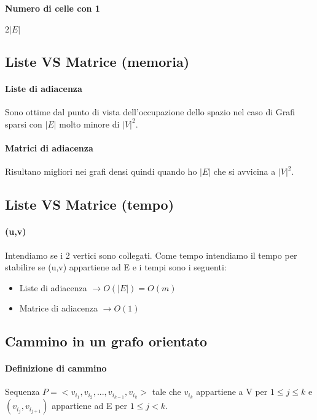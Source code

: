 \paragraph*{Numero di celle con 1} $2|E|$
\subsection{Liste VS Matrice (memoria)}
\paragraph*{Liste di adiacenza} Sono ottime dal punto di vista dell'occupazione dello spazio 
nel caso di Grafi sparsi con $|E|$ molto minore di $|V|^2$.
\paragraph*{Matrici di adiacenza} Risultano migliori nei grafi densi quindi quando ho
$|E|$ che si avvicina a $|V|^2$.
\subsection{Liste VS Matrice (tempo)}
\paragraph*{(u,v)} Intendiamo se i 2 vertici sono collegati.
Come tempo intendiamo il tempo per stabilire se (u,v) appartiene ad E e i tempi
sono i seguenti:
\begin{itemize}
    \item Liste di adiacenza $\rightarrow O(|E|) = O(m)$
    \item Matrice di adiacenza $\rightarrow O(1)$
\end{itemize}
\subsection{Cammino in un grafo orientato}
\paragraph*{Definizione di cammino} Sequenza $P=<v_{i_1},v_{i_2},..., v_{i_{k-1}},v_{i_k}>$
tale che $v_{i_k}$ appartiene a V per $1\leq j \leq k$ e $(v_{i_j},v_{i_{j+1}})$ appartiene
ad E per $1 \leq j < k$.
